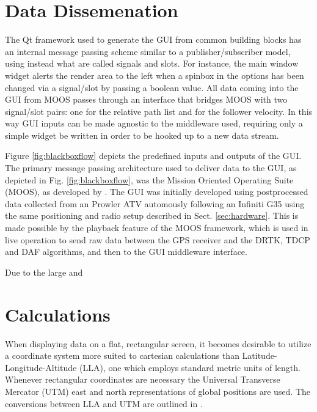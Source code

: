 \documentclass[12pt]{report}
\begin{document}
\section{Data Dissemenation} \label{sec:datadiss}


The Qt framework used to generate the GUI from common building blocks has an internal message passing scheme similar to a publisher/subscriber model, using instead what are called signals and slots. For instance, the main window widget alerts the render area to the left when a spinbox in the options has been changed via a signal/slot by passing a boolean value. All data coming into the GUI from MOOS passes through an interface that bridges MOOS with two signal/slot pairs: one for the relative path list and for the follower velocity. In this way GUI inputs can be made agnostic to the middleware used, requiring only a simple widget be written in order to be hooked up to a new data stream.

Figure \ref{fig:blackboxflow} depicts the predefined inputs and outputs of the GUI. The primary message passing architecture used to deliver data to the GUI, as depicted in Fig. \ref{fig:blackboxflow}, was the Mission Oriented Operating Suite (MOOS), as developed by \cite{moos}. The GUI was initially developed using postprocessed data collected from an Prowler ATV automously following an Infiniti G35 using the same positioning and radio setup described in Sect. \ref{sec:hardware}. This is made possible by the playback feature of the MOOS framework, which is used in live operation to send raw data between the GPS receiver and the DRTK, TDCP and DAF algorithms, and then to the GUI middleware interface.

Due to the large and 

\section{Calculations} \label{sec:guicalc}

When displaying data on a flat, rectangular screen, it becomes desirable to utilize a coordinate system more suited to cartesian calculations than Latitude-Longitude-Altitude (LLA), one which employs standard metric units of length. Whenever rectangular coordinates are necessary the Universal Transverse Mercator (UTM) east and north representations of global positions are used. The conversions between LLA and UTM are outlined in \cite{projections}.
\end{document}
